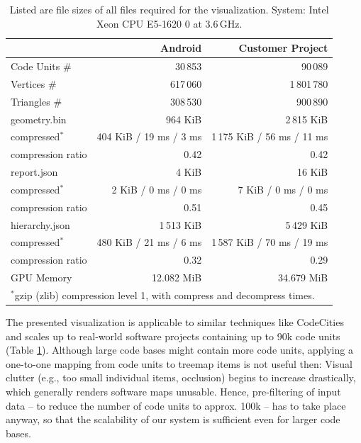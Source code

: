 \documentclass[annual]{acmsiggraph}
\newcommand{\scite}[1]{~\cite{#1}}
\begin{document}
\begin{table}[b!]
	\begin{tabular*}{\linewidth}{@{\extracolsep{\fill}}lrr}
		\toprule
			& Android & Customer Project \\
		\midrule

		Code Units \#     &  30\,853  &     90\,089 \\
		\addlinespace

		Vertices \#       & 617\,060  & 1\,801\,780 \\
		Triangles \#      & 308\,530  &    900\,890 \\
		\addlinespace

		geometry.bin      &  964 KiB  &  2\,815 KiB \\
		\small
		compressed$^*$ & \small 404 KiB / 19 ms / 3 ms & \small 1\,175 KiB / 56 ms / 11 ms	\\
		\small 
		compression ratio & \small 0.42 & \small 0.42 \\	
		\addlinespace

		report.json       &    4 KiB  & 16 KiB \\
		\small 
		compressed$^*$ & \small 2 KiB / 0 ms / 0 ms	& \small 7 KiB / 0 ms / 0 ms \\
		\small
		compression ratio & \small 0.51	& \small 0.45 \\
		\addlinespace

		hierarchy.json    & 1\,513 KiB  &  5\,429 KiB\\
		\small
		compressed$^*$	& \small 480 KiB / 21 ms / 6 ms	& \small 1\,587 KiB / 70 ms / 19 ms \\
		\small
		compression ratio & \small 0.32 & \small 0.29 \\
		\addlinespace

		GPU Memory        & 12.082 MiB  & 34.679 MiB \\
		\bottomrule

		\multicolumn{3}{l}{\small $^*$gzip (zlib) compression level 1, with compress and decompress times.}\\
	\end{tabular*}
	\caption{
		Listed are file sizes of all files required for the visualization.
		System: Intel Xeon CPU E5-1620 0 at 3.6\,GHz. }
	\label{tab:performance}
\end{table}

The presented visualization is applicable to similar techniques like CodeCities\scite{Wettel2007a} and scales up to real-world software projects containing up to 90k code units (Table \ref{tab:performance}).
Although large code bases might contain more code units, applying a one-to-one mapping from code units to treemap items is not useful then: Visual clutter (e.g., too small individual items, occlusion) begins to increase drastically, which generally renders software maps unusable.
Hence, pre-filtering of input data -- to reduce the number of code units to approx. 100k -- has to take place anyway, so that the scalability of our system is sufficient even for larger code bases.
\end{document}
